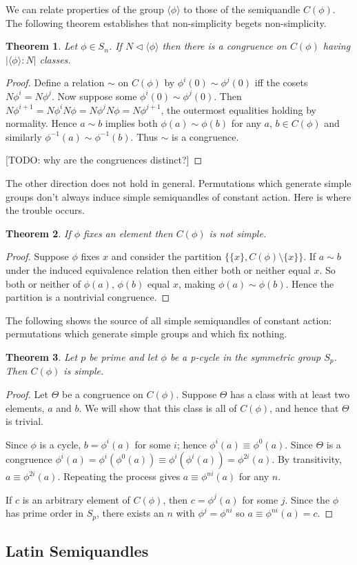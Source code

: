 \documentclass{amsart}
\newtheorem{thm}{Theorem}[section]
\theoremstyle{definition}
\numberwithin{equation}{section}
\begin{document}
We can relate properties of the group $\langle\phi\rangle$ to those of the semiquandle $C(\phi)$.
The following theorem establishes that non-simplicity begets non-simplicity.

\begin{thm}
Let $\phi \in S_n$. If $N \lhd \langle\phi\rangle$ then there is a congruence on
$C(\phi)$ having $\left|\langle\phi\rangle : N\right|$ classes.
\end{thm}
\begin{proof}
Define a relation $\sim$ on $C(\phi)$ by $\phi^{i}(0) \sim \phi^{j}(0)$ iff
the cosets $N\phi^{i} = N\phi^{j}$. Now suppose some $\phi^{i}(0) \sim \phi^{j}(0)$. Then
$N\phi^{i+1} = N\phi^{i}N\phi = N\phi^{j}N\phi = N\phi^{j+1}$, the outermost equalities holding
by normality. Hence $a \sim b$ implies both $\phi(a) \sim \phi(b)$ for any $a$, $b \in C(\phi)$
and similarly $\phi^{-1}(a) \sim \phi^{-1}(b)$. Thus $\sim$ is a congruence.

[TODO: why are the congruences distinct?]
\end{proof}

The other direction does not hold in general. Permutations which generate simple groups don't
always induce simple semiquandles of constant action. Here is where the trouble occurs.

\begin{thm}
If $\phi$ fixes an element then $C(\phi)$ is not simple.
\end{thm}
\begin{proof}
Suppose $\phi$ fixes $x$ and consider the partition $\{ \{x\}, C(\phi) \setminus \{x\} \}$.
If $a \sim b$ under the induced equivalence relation then either both or neither equal $x$.
So both or neither of $\phi(a)$, $\phi(b)$ equal $x$, making $\phi(a) \sim \phi(b)$.
Hence the partition is a nontrivial congruence.
\end{proof}

The following shows the source of all simple semiquandles of constant action: permutations
which generate simple groups and which fix nothing.

\begin{thm}
Let $p$ be prime and let $\phi$ be a p-cycle in the symmetric group $S_p$.
Then $C(\phi)$ is simple.
\end{thm}
\begin{proof}
Let $\Theta$ be a congruence on $C(\phi)$. Suppose $\Theta$ has a class with
at least two elements, $a$ and $b$. We will show that this class is all of
$C(\phi)$, and hence that $\Theta$ is trivial.

Since $\phi$ is a cycle, $b = \phi^{i}(a)$ for some $i$; hence
$\phi^{i}(a) \equiv \phi^{0}(a)$. Since $\Theta$ is a congruence $\phi^{i}(a) =
\phi^{i}(\phi^{0}(a)) \equiv \phi^{i}(\phi^{i}(a)) = \phi^{2i}(a)$. By transitivity,
$a \equiv \phi^{2i}(a)$. Repeating the process gives $a \equiv \phi^{ni}(a)$ for any $n$.

If $c$ is an arbitrary element of $C(\phi)$, then $c = \phi^{j}(a)$ for some $j$.
Since the $\phi$ has prime order in $S_p$, there exists an $n$ with
$\phi^{j} = \phi^{ni}$ so $a \equiv \phi^{ni}(a) = c$.
\end{proof}

\subsection{Latin Semiquandles}
\end{document}
